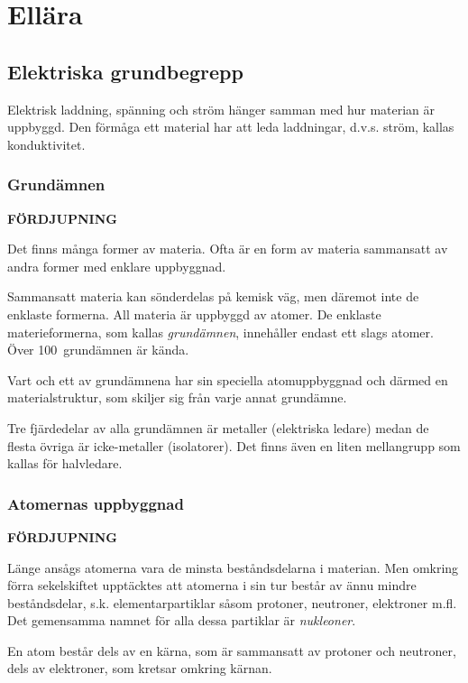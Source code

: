 \chapter{Ellära}
\label{ellära}

\section{Elektriska grundbegrepp}


Elektrisk laddning, spänning och ström hänger samman med hur materian är
uppbyggd.
Den förmåga ett material har att leda laddningar, d.v.s. ström, kallas
konduktivitet.

\subsection{Grundämnen}
\textbf{FÖRDJUPNING}

Det finns många former av materia.
Ofta är en form av materia sammansatt av andra former med enklare uppbyggnad.

Sammansatt materia kan sönderdelas på kemisk väg, men däremot inte de enklaste
formerna.
All materia är uppbyggd av atomer.
De enklaste materieformerna, som kallas \emph{grundämnen}, innehåller endast
ett slags atomer.
Över 100~grundämnen är kända.

Vart och ett av grundämnena har sin speciella atomuppbyggnad och därmed en
materialstruktur, som skiljer sig från varje annat grundämne.

Tre fjärdedelar av alla grundämnen är metaller (elektriska ledare) medan de
flesta övriga är icke-metaller (isolatorer).
Det finns även en liten mellangrupp som kallas för halvledare.

\subsection{Atomernas uppbyggnad}
\textbf{FÖRDJUPNING}

Länge ansågs atomerna vara de minsta beståndsdelarna i materian.
Men omkring förra sekelskiftet upptäcktes att atomerna i sin tur består av ännu mindre
beståndsdelar, s.k. elementarpartiklar såsom protoner, neutroner, elektroner
m.fl.
Det gemensamma namnet för alla dessa partiklar är \emph{nukleoner}.

En atom består dels av en kärna, som är sammansatt av protoner och neutroner,
dels av elektroner, som kretsar omkring kärnan.

